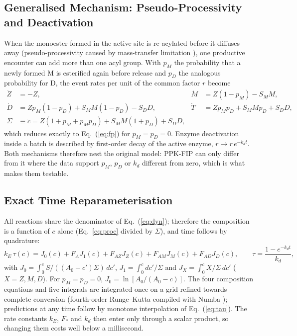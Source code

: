 \subsection{Generalised Mechanism: Pseudo-Processivity and Deactivation}
When the monoester formed in the active site is re-acylated before it diffuses away (pseudo-processivity caused by mass-transfer limitation \cite{mitchell2023}), one productive encounter can add more than one acyl group. With $p_M$ the probability that a newly formed M is esterified again before release and $p_D$ the analogous probability for D, the event rates per unit of the common factor $r$ become
\begin{align}
\dot Z&=-Z, & \dot M&=Z(1-p_M)-S_MM,\nonumber\\
\dot D&=Zp_M(1-p_D)+S_MM(1-p_D)-S_DD, & \dot T&=Zp_Mp_D+S_MMp_D+S_DD,\nonumber\\
\Sigma&\equiv\dot c=Z(1+p_M+p_Mp_D)+S_MM(1+p_D)+S_DD,\label{eq:proc}
\end{align}
which reduces exactly to Eq.~(\ref{eq:fp}) for $p_M=p_D=0$. Enzyme deactivation inside a batch is described by first-order decay of the active enzyme, $r\to r\,e^{-k_dt}$. Both mechanisms therefore nest the original model: PPK-FIP can only differ from it where the data support $p_M$, $p_D$ or $k_d$ different from zero, which is what makes them testable.

\subsection{Exact Time Reparameterisation}
All reactions share the denominator of Eq.~(\ref{eq:dyn}); therefore the composition is a function of $c$ alone (Eq.~\ref{eq:proc} divided by $\Sigma$), and time follows by quadrature:
\begin{equation}
k_E\,\tau(c)=J_0(c)+F_AJ_1(c)+F_{AZ}J_Z(c)+F_{AM}J_M(c)+F_{AD}J_D(c),\qquad \tau=\frac{1-e^{-k_dt}}{k_d},\label{eq:tau}
\end{equation}
with $J_0=\int_0^c S/((A_0-c')\Sigma)\,dc'$, $J_1=\int_0^c dc'/\Sigma$ and $J_X=\int_0^c X/\Sigma\,dc'$ ($X=Z,M,D$). For $p_M=p_D=0$, $J_0=\ln[A_0/(A_0-c)]$. The four composition equations and five integrals are integrated once on a grid refined towards complete conversion (fourth-order Runge--Kutta compiled with Numba \cite{lam2015}); predictions at any time follow by monotone interpolation of Eq.~(\ref{eq:tau}). The rate constants $k_E$, $F_\ast$ and $k_d$ then enter only through a scalar product, so changing them costs well below a millisecond.


